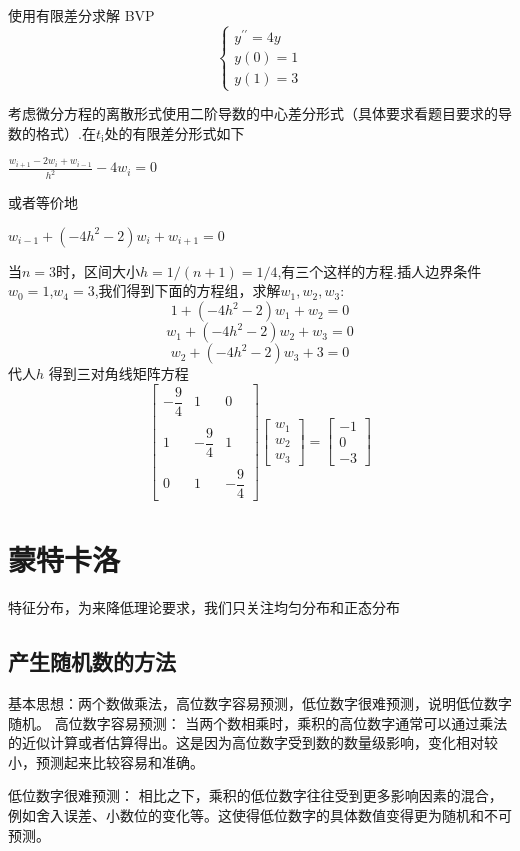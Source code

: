 \documentclass[UTF8,5pt,a4paper]{ctexart} %
\begin{document}
\begin{multicols}{4}
使用有限差分求解 BVP
$$\begin{cases}y^{\prime\prime}=4y\\y(0)=1\\y(1)=3\end{cases}$$

考虑微分方程的离散形式使用二阶导数的中心差分形式（具体要求看题目要求的导数的格式）.在$t_\mathrm{i}$处的有限差分形式如下

$\frac{w_{i+1}-2w_{i}+w_{i-1}}{h^{2}}-4w_{i}=0$

 或者等价地

$w_{i-1}+(-4h^{2}-2)w_{i}+w_{i+1}=0$

当$n=3$时，区间大小$h=1/(n+1)=1/4$,有三个这样的方程.插人边界条件$w_0=1$,$w_4=3$,我们得到下面的方程组，求解$w_1,w_2,w_3:$
$$1+(-4h^2-2)w_1+w_2=0$$
$$w_1+(-4h^2-2)w_2+w_3=0$$
$$w_2+(-4h^2-2)w_3+3=0$$
代人$h$ 得到三对角线矩阵方程
$$\begin{bmatrix}-\dfrac{9}{4}&1&0\\\\1&-\dfrac{9}{4}&1\\\\0&1&-\dfrac{9}{4}\end{bmatrix}\begin{bmatrix}w_1\\w_2\\w_3\end{bmatrix}=\begin{bmatrix}-1\\0\\-3\end{bmatrix}$$

\section{蒙特卡洛}
特征分布，为来降低理论要求，我们只关注均匀分布和正态分布
\subsection{产生随机数的方法}
基本思想：两个数做乘法，高位数字容易预测，低位数字很难预测，说明低位数字随机。
高位数字容易预测： 当两个数相乘时，乘积的高位数字通常可以通过乘法的近似计算或者估算得出。这是因为高位数字受到数的数量级影响，变化相对较小，预测起来比较容易和准确。

低位数字很难预测： 相比之下，乘积的低位数字往往受到更多影响因素的混合，例如舍入误差、小数位的变化等。这使得低位数字的具体数值变得更为随机和不可预测。



\end{multicols}
\end{document}

